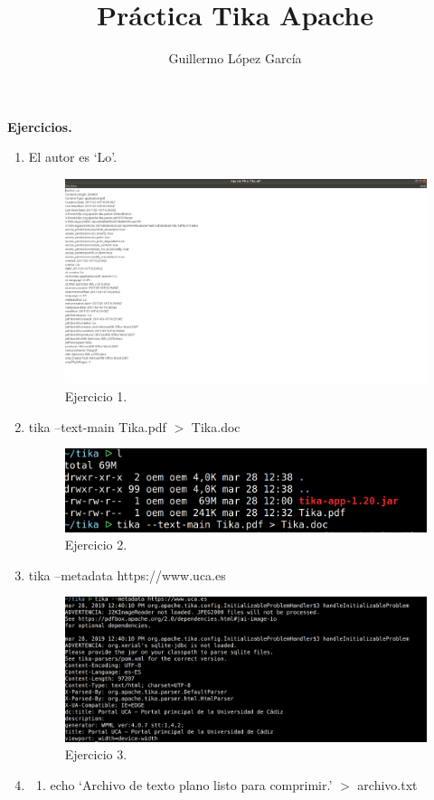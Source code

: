 \documentclass{article}
\title{Práctica Tika Apache}
\author{Guillermo López García}
\begin{document}

\textbf{Ejercicios.}
\begin{enumerate}
    \item El autor es `Lo'.
        \begin{figure}[H]
        \centering
        \includegraphics[width=0.7\linewidth]{./ej1}
        \caption{Ejercicio 1.}
        \end{figure}
    \item tika --text-main Tika.pdf $>$ Tika.doc
        \begin{figure}[H]
        \centering
        \includegraphics[width=0.7\linewidth]{./ej2}
        \caption{Ejercicio 2.}
        \end{figure}
    \item tika --metadata https://www.uca.es
        \begin{figure}[H]
        \centering
        \includegraphics[width=0.7\linewidth]{./ej3}
        \caption{Ejercicio 3.}
        \end{figure}
    \item
        \begin{enumerate}
            \item echo `Archivo de texto plano listo para comprimir.' $>$ archivo.txt

\end{enumerate}
\end{enumerate}
\end{document}
